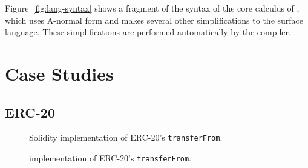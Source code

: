 \documentclass[dvipsnames, usenames, sigconf]{acmart}
\begin{document}
Figure~\ref{fig:lang-syntax} shows a fragment of the syntax of the core calculus of \langName, which uses A-normal form and makes several other simplifications to the surface \langName language.
These simplifications are performed automatically by the compiler.

\section{Case Studies}
\subsection{ERC-20}
\begin{figure*}[h]
    \centering
    \begin{subfigure}[t]{0.5\textwidth}
        \centering
        
        \caption{Solidity implementation of ERC-20's \lstinline{transferFrom}.}
        \label{fig:erc20-impl-sol}
    \end{subfigure}%
    \begin{subfigure}[t]{0.5\textwidth}
        \centering
        
        \caption{\langName implementation of ERC-20's \lstinline{transferFrom}.}
        \label{fig:erc20-impl-flow}
    \end{subfigure}
    \label{fig:erc20-impl}
\end{figure*}
\end{document}
